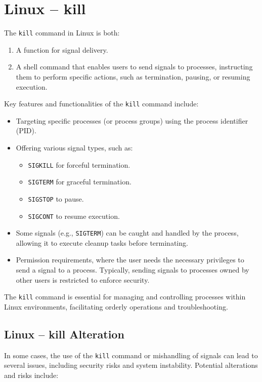 \section{Linux – kill}

The \texttt{kill} command in Linux is both:
\begin{enumerate}
    \item A function for signal delivery.
    \item A shell command that enables users to send signals to processes, instructing them to perform specific actions, such as termination, pausing, or resuming execution.
\end{enumerate}

Key features and functionalities of the \texttt{kill} command include:
\begin{itemize}
    \item Targeting specific processes (or process groups) using the process identifier (PID).
    \item Offering various signal types, such as:
    \begin{itemize}
        \item \texttt{SIGKILL} for forceful termination.
        \item \texttt{SIGTERM} for graceful termination.
        \item \texttt{SIGSTOP} to pause.
        \item \texttt{SIGCONT} to resume execution.
    \end{itemize}
    \item Some signals (e.g., \texttt{SIGTERM}) can be caught and handled by the process, allowing it to execute cleanup tasks before terminating.
    \item Permission requirements, where the user needs the necessary privileges to send a signal to a process. Typically, sending signals to processes owned by other users is restricted to enforce security.
\end{itemize}

The \texttt{kill} command is essential for managing and controlling processes within Linux environments, facilitating orderly operations and troubleshooting.

\subsection{Linux – kill Alteration}

In some cases, the use of the \texttt{kill} command or mishandling of signals can lead to several issues, including security risks and system instability. Potential alterations and risks include:


